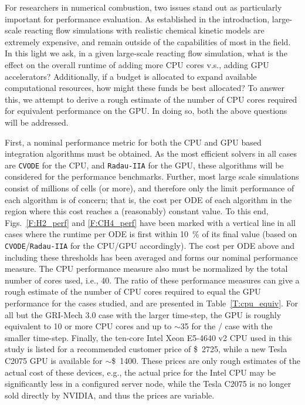 \documentclass[final,twocolumn]{elsarticle}
\begin{document}
For researchers in numerical combustion, two issues stand out as particularly important for performance evaluation.
As established in the introduction, large-scale reacting flow simulations with realistic chemical kinetic models are extremely expensive, and remain outside of the capabilities of most in the field.
In this light we ask, in a given large-scale reacting flow simulation, what is the effect on the overall runtime of adding more CPU cores v.s., adding GPU accelerators?
Additionally, if a budget is allocated to expand available computational resources, how might these funds be best allocated?
To answer this, we attempt to derive a rough estimate of the number of CPU cores required for equivalent performance on the GPU.
In doing so, both the above questions will be addressed.

First, a nominal performance metric for both the CPU and GPU based integration algorithms must be obtained.
As the most efficient solvers in all cases are \texttt{CVODE} for the CPU, and \texttt{Radau-IIA} for the GPU, these algorithms will be considered for the performance benchmarks.
Further, most large scale simulations consist of millions of cells (or more), and therefore only the limit performance of each algorithm is of concern; that is, the cost per ODE of each algorithm in the region where this cost reaches a (reasonably) constant value.
To this end, Figs.~\ref{F:H2_perf} and \ref{F:CH4_perf} have been marked with a vertical line in all cases where the runtime per ODE is first within \SI{10}{\percent} of its final value (based on \texttt{CVODE}\slash\texttt{Radau-IIA} for the CPU\slash GPU accordingly).
The cost per ODE above and including these thresholds has been averaged and forms our nominal performance measure.
The CPU performance measure also must be normalized by the total number of cores used, i.e., \num{40}.
The ratio of these performance measures can give a rough estimate of the number of CPU cores required to equal the GPU performance for the cases studied, and are presented in Table~\ref{T:cpu_equiv}.
For all but the GRI-Mech 3.0 case with the larger time-step, the GPU is roughly equivalent to \num{10} or more CPU cores and up to $\sim$\num{35} for the \slash{} case with the smaller time-step.
Finally, the ten-core Intel Xeon E5-4640 v2 CPU used in this study is listed for a recommended customer price of \SI{2725}[\$]{}, while a new Tesla C2075 GPU is available for $\sim$\SI{1400}[\$]{}.
These prices are only rough estimates of the actual cost of these devices, e.g., the actual price for the Intel CPU may be significantly less in a configured server node, while the Tesla C2075 is no longer sold directly by NVIDIA, and thus the prices are variable.
\end{document}
